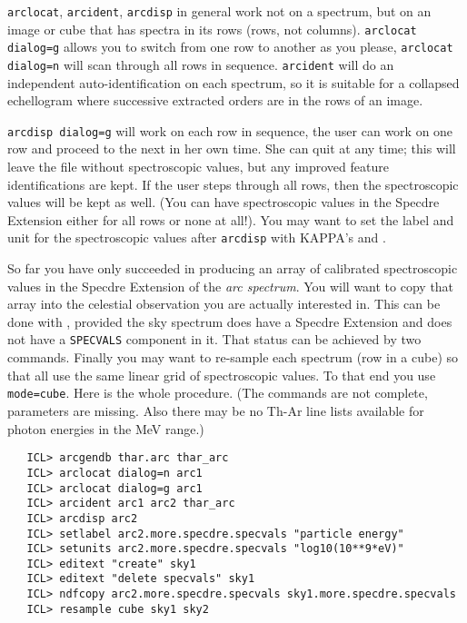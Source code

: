    {\tt arclocat}, {\tt arcident}, {\tt arcdisp} in general work not on
   a spectrum, but on an image or cube that has spectra in its rows
   (rows, not columns). {\tt arclocat dialog=g} allows you to switch
   from one row to another as you please, {\tt arclocat dialog=n} will
   scan through all rows in sequence.  {\tt arcident} will do an
   independent auto-identification on each spectrum, so it is suitable
   for a collapsed echellogram where successive extracted orders are in
   the rows of an image.

   {\tt arcdisp dialog=g} will work on each row in sequence, the user
   can work on one row and proceed to the next in her own time.  She can
   quit at any time; this will leave the file without spectroscopic
   values, but any improved feature identifications are kept.  If the
   user steps through all rows, then the spectroscopic values will be
   kept as well. (You can have spectroscopic values in the Specdre
   Extension either for all rows or none at all!).  You may want to set
   the label and unit for the spectroscopic values after {\tt arcdisp}
   with KAPPA's
{\tt{}}
   and
{\tt{}}.

   So far you have only succeeded in producing an array of calibrated
   spectroscopic values in the Specdre Extension of the {\it arc
   spectrum}. You will want to copy that array into the celestial
   observation you are actually interested in.  This can be done with
{\tt{}},
   provided the sky spectrum does have a Specdre Extension and does not
   have a {\tt SPECVALS} component in it.  That status can be achieved
   by two
{\tt{}}
   commands.  Finally you may want to re-sample each spectrum (row in a
   cube) so that all use the same linear grid of spectroscopic
   values. To that end you use
{\tt{} mode=cube}.
   Here is the whole procedure.  (The commands are not complete,
   parameters are missing.  Also there may be no Th-Ar line lists
   available for photon energies in the MeV range.)

\begin{verbatim}
   ICL> arcgendb thar.arc thar_arc
   ICL> arclocat dialog=n arc1
   ICL> arclocat dialog=g arc1
   ICL> arcident arc1 arc2 thar_arc
   ICL> arcdisp arc2
   ICL> setlabel arc2.more.specdre.specvals "particle energy"
   ICL> setunits arc2.more.specdre.specvals "log10(10**9*eV)"
   ICL> editext "create" sky1
   ICL> editext "delete specvals" sky1
   ICL> ndfcopy arc2.more.specdre.specvals sky1.more.specdre.specvals
   ICL> resample cube sky1 sky2
\end{verbatim}

